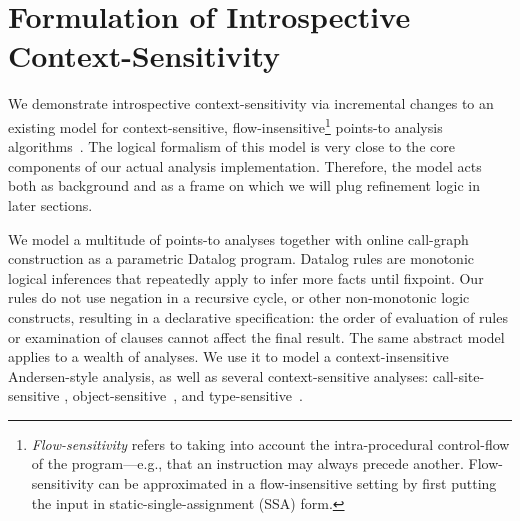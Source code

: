 \section{Formulation of Introspective Context-Sensitivity}
\label{model}

We demonstrate introspective context-sensitivity via incremental
changes to an existing model for context-sensitive,
flow-insensitive\footnote{\emph{Flow-sensitivity} refers to taking
  into account the intra-procedural control-flow of the
  program---e.g., that an instruction may always precede
  another. Flow-sensitivity can be approximated in a flow-insensitive
  setting by first putting the input in static-single-assignment (SSA)
  form.} points-to analysis
algorithms~\cite{exceptions-cc13,hybrid-pldi13}. The logical formalism
of this model is very close to the core components of our actual
analysis implementation. Therefore, the model acts both as background
and as a frame on which we will plug refinement logic in later
sections.

We model a multitude of points-to analyses together with online
call-graph construction as a parametric Datalog program.  Datalog
rules are monotonic logical inferences that repeatedly apply to infer
more facts until fixpoint. Our rules do not use negation in a
recursive cycle, or other non-monotonic logic constructs, resulting in
a declarative specification: the order of evaluation of rules or
examination of clauses cannot affect the final result. The same
abstract model applies to a wealth of analyses. We use it to model a
context-insensitive Andersen-style \cite{dvanhorn:andersen-phd94}
analysis, as well as several context-sensitive analyses:
call-site-sensitive \cite{Sharir:Interprocedural,Shivers:1991:diss},
object-sensitive~\cite{1044835}, and type-sensitive~\cite{pointsto-popl11}.

